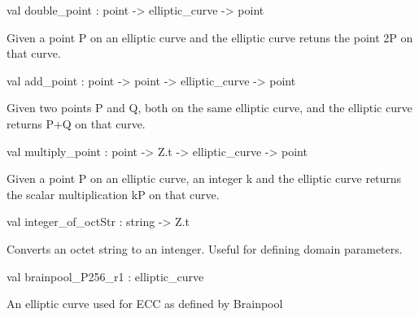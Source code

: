 \documentclass[12pt]{article}
\begin{document}
\begin{ocamldocsigend}
\label{val:Ecc.Ecc.double-underscorepoint}\begin{ocamldoccode}
val double_point : point -> elliptic_curve -> point
\end{ocamldoccode}
\begin{ocamldocdescription}
Given a point P on an elliptic curve and the elliptic curve retuns the point 2P 
        on that curve.


\end{ocamldocdescription}


\label{val:Ecc.Ecc.add-underscorepoint}\begin{ocamldoccode}
val add_point : point -> point -> elliptic_curve -> point
\end{ocamldoccode}
\begin{ocamldocdescription}
Given two points P and Q, both on the same elliptic curve, and the elliptic curve returns 
        P+Q on that curve.


\end{ocamldocdescription}


\label{val:Ecc.Ecc.multiply-underscorepoint}\begin{ocamldoccode}
val multiply_point : point -> Z.t -> elliptic_curve -> point
\end{ocamldoccode}
\begin{ocamldocdescription}
Given a point P on an elliptic curve, an integer k and the elliptic curve returns 
        the scalar multiplication kP on that curve.


\end{ocamldocdescription}




\label{val:Ecc.Ecc.integer-underscoreof-underscoreoctStr}\begin{ocamldoccode}
val integer_of_octStr : string -> Z.t
\end{ocamldoccode}
\begin{ocamldocdescription}
Converts an octet string to an intenger. Useful for defining domain parameters.


\end{ocamldocdescription}


\label{val:Ecc.Ecc.brainpool-underscoreP256-underscorer1}\begin{ocamldoccode}
val brainpool_P256_r1 : elliptic_curve
\end{ocamldoccode}
\begin{ocamldocdescription}
An elliptic curve used for ECC as defined by Brainpool



\end{ocamldocdescription}
\end{ocamldocsigend}
\end{document}
